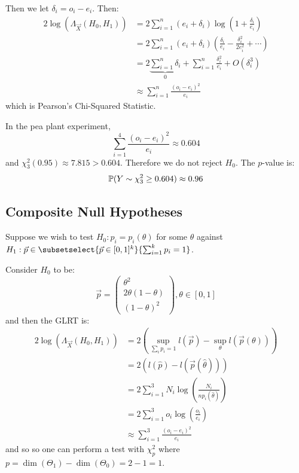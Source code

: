 \documentclass[../Main.tex]{subfiles}
\begin{document}
\begin{example}
    Then we let $\delta_i = o_i - e_i$. Then:
    \begin{align*}
        2\log(\Lambda_{\vec{X}}(H_0, H_1)) &= 2\sum_{i=1}^{n} (e_i + \delta_i) \log\left(1 + \frac{\delta_i}{e_i}\right) \\
        &= 2 \sum_{i=1}^{n} (e_i + \delta_i) \left(\frac{\delta_i}{e_i} - \frac{\delta_i^2}{2e_i^2} + \cdots\right) \\
        &= 2\underbrace{\sum_{i=1}^{n} \delta_i}_{0} + \sum_{i=1}^{n} \frac{\delta_i^2}{e_i} + O(\delta_i^3) \\
        &\approx \sum_{i=1}^{n} \frac{(o_i - e_i)^2}{e_i}
    \end{align*}
    which is Pearson's Chi-Squared Statistic.

    In the pea plant experiment,
    \begin{equation*}
        \sum_{i=1}^{4} \frac{(o_i - e_i)^2}{e_i} \approx 0.604
    \end{equation*}
    and $\chi_3^2(0.95) \approx 7.815 > 0.604$. Therefore we do not reject $H_0$. The $p$-value is:
    \begin{equation*}
        \P(Y \sim \chi_3^2 \geq 0.604) \approx 0.96
    \end{equation*}
\end{example}
\subsection{Composite Null Hypotheses}
Suppose we wish to test $H_0 : p_i = p_i(\theta)$ for some $\theta$ against $H_1 : \vec{p} \in \subsetselect{\vec{p} \in [0, 1]^k}{\sum_{i=1}^{k} p_i = 1}$.
\begin{example}
    Consider $H_0$ to be:
    \begin{equation*}
        \vec{p} = \begin{pmatrix}\theta^2 \\ 2\theta(1-\theta) \\ (1-\theta)^2\end{pmatrix}, \theta \in [0, 1]
    \end{equation*}
    and then the GLRT is:
    \begin{align*}
        2\log(\Lambda_{\vec{X}}(H_0, H_1)) &= 2 \left(\sup_{\sum_i p_i = 1} l(\vec{p}) - \sup_\theta l(\vec{p}(\theta))\right) \\
        &= 2 \left(l(\hat{p}) - l(\vec{p}(\hat{\theta}))\right) \\
        &= 2\sum_{i=1}^{3} N_i \log\left(\frac{N_i}{n p_i(\hat{\theta})}\right) \\
        &= 2\sum_{i=1}^{3} o_i \log\left(\frac{o_i}{e_i}\right) \\
        &\approx \sum_{i=1}^{3} \frac{(o_i - e_i)^2}{e_i}
    \end{align*}
    and so so one can perform a test with $\chi_p^2$ where $p = \dim(\Theta_1) - \dim(\Theta_0) = 2 - 1 = 1$.
\end{example}
\end{document}
